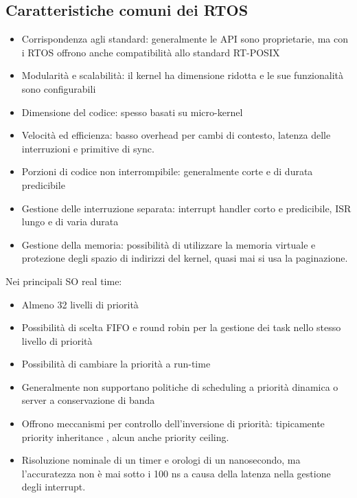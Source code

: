 \documentclass[12pt, oneside]{extbook}
\begin{document}
\subsection{Caratteristiche comuni dei RTOS}
\begin{itemize}
\item Corrispondenza agli standard: generalmente le API sono proprietarie, ma con i RTOS offrono anche compatibilità allo standard RT-POSIX
\item Modularità e scalabilità: il kernel ha dimensione ridotta e le sue funzionalità sono configurabili
\item Dimensione del codice: spesso basati su micro-kernel
\item Velocità ed efficienza: basso overhead per cambi di contesto, latenza delle interruzioni e primitive di sync.
\item Porzioni di codice non interrompibile: generalmente corte e di durata predicibile
\item Gestione delle interruzione separata: interrupt handler corto e predicibile, ISR lungo e di varia durata
\item Gestione della memoria: possibilità di utilizzare la memoria virtuale e protezione degli spazio di indirizzi del kernel, quasi mai si usa la paginazione.
\end{itemize}
Nei principali SO real time:
\begin{itemize}
\item Almeno 32 livelli di priorità
\item Possibilità di scelta FIFO e round robin per la gestione dei task nello stesso livello di priorità
\item Possibilità di cambiare la priorità a run-time
\item Generalmente non supportano politiche di scheduling a priorità dinamica o server a conservazione di banda
\item Offrono meccanismi per controllo dell'inversione di priorità: tipicamente priority inheritance , alcun anche priority ceiling.
\item Risoluzione nominale di un timer e orologi di un nanosecondo, ma l'accuratezza non è mai sotto i 100 ns a causa della latenza nella gestione degli interrupt.
\end{itemize}
\end{document}

